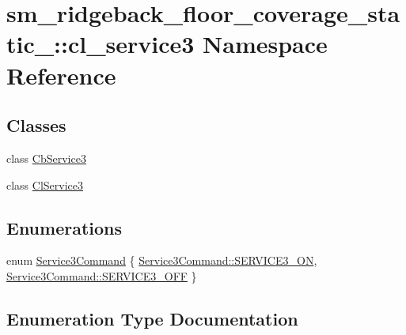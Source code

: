 \hypertarget{namespacesm__ridgeback__floor__coverage__static__1_1_1cl__service3}{}\section{sm\+\_\+ridgeback\+\_\+floor\+\_\+coverage\+\_\+static\+\_\+:\+:cl\+\_\+service3 Namespace Reference}
\label{namespacesm__ridgeback__floor__coverage__static__1_1_1cl__service3}
\subsection*{Classes}
\begin{DoxyCompactItemize}
\item 
class \hyperlink{classsm__ridgeback__floor__coverage__static__1_1_1cl__service3_1_1CbService3}{Cb\+Service3}
\item 
class \hyperlink{classsm__ridgeback__floor__coverage__static__1_1_1cl__service3_1_1ClService3}{Cl\+Service3}
\end{DoxyCompactItemize}
\subsection*{Enumerations}
\begin{DoxyCompactItemize}
\item 
enum \hyperlink{namespacesm__ridgeback__floor__coverage__static__1_1_1cl__service3_aaba74bbc34b595ed42909975cedd5961}{Service3\+Command} \{ \hyperlink{namespacesm__ridgeback__floor__coverage__static__1_1_1cl__service3_aaba74bbc34b595ed42909975cedd5961a13cdca48a01bbb44fa8fb35567fbc58e}{Service3\+Command\+::\+S\+E\+R\+V\+I\+C\+E3\+\_\+\+ON}, 
\hyperlink{namespacesm__ridgeback__floor__coverage__static__1_1_1cl__service3_aaba74bbc34b595ed42909975cedd5961a642ed22a7f6b816840289b4256116e9e}{Service3\+Command\+::\+S\+E\+R\+V\+I\+C\+E3\+\_\+\+O\+FF}
 \}
\end{DoxyCompactItemize}


\subsection{Enumeration Type Documentation}
\mbox{\label{namespacesm__ridgeback__floor__coverage__static__1_1_1cl__service3_aaba74bbc34b595ed42909975cedd5961}} 
